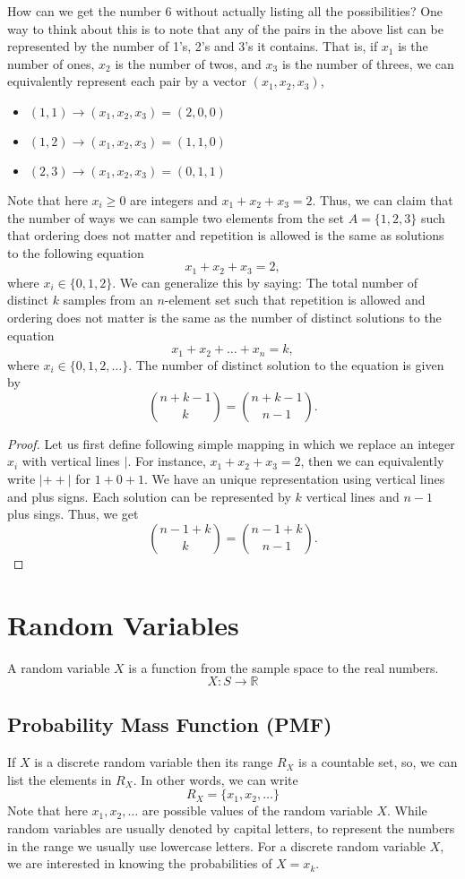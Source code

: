 How can we get the number 6 without actually listing all the possibilities? One way to think about this is to note that any of the pairs in the above list can be represented by the number of 1's, 2's and 3's it contains. That is, if $x_1$ is the number of ones, $x_2$ is the number of twos, and $x_3$ is the number of threes, we can equivalently represent each pair by a vector $(x_1,x_2,x_3)$, \ie
\begin{itemize}
	\item$(1,1)\to(x_1,x_2,x_3) = (2,0,0)$ 
	\item$(1,2)\to(x_1,x_2,x_3) = (1,1,0)$ 
	\item$(2,3)\to(x_1,x_2,x_3) = (0,1,1)$ 
\end{itemize}
Note that here $x_i\geq 0$ are integers and $x_1+x_2+x_3=2$. Thus, we can claim that the number of ways we can sample two elements from the set $A=\{1,2,3\}$ such that ordering does not matter and repetition is allowed is the same as solutions to the following equation
$$x_1+x_2+x_3=2,$$
 where $x_i\in\{0,1,2\}$. We can generalize this by saying: The total number of distinct $k$ samples from an $n$-element set such that repetition is allowed and ordering does not matter is the same as the number of distinct solutions to the equation 
$$x_1+x_2+\dots+x_n=k,$$
where $x_i \in \{0, 1, 2,\dots\}$. The number of distinct solution to the equation is given by
$$\binom{n+k-1}{k}=\binom{n+k-1}{n-1}.$$
\begin{proof}
	Let us first define following simple mapping in which we replace an integer $x_i$ with vertical lines \ie $|$. For instance, $x_1+x_2+x_3=2$, then we can equivalently write $|++|$ for $1+0+1$. We have an unique representation using vertical lines and plus signs. Each solution can be represented by $k$ vertical lines and $n-1$ plus sings. Thus, we get 
$$\binom{n-1+k}{k}=\binom{n-1+k}{n-1}.$$
\end{proof}

\section{Random Variables}
A random variable $X$ is a function from the sample space to the real numbers.
$$X:S\to \mathbb{R}$$

\subsection{Probability Mass Function (PMF)}
If $X$ is a discrete random variable then its range $R_X$ is a countable set, so, we can list the elements in $R_X$. In other words, we can write 
$$R_X=\{x_1,x_2,\dots\}$$
Note that here $x_1,x_2,\dots$ are possible values of the random variable $X$. While random variables are usually denoted by capital letters, to represent the numbers in the range we usually use lowercase letters. For a discrete random variable $X$, we are interested in knowing the probabilities of $X=x_k$. 

